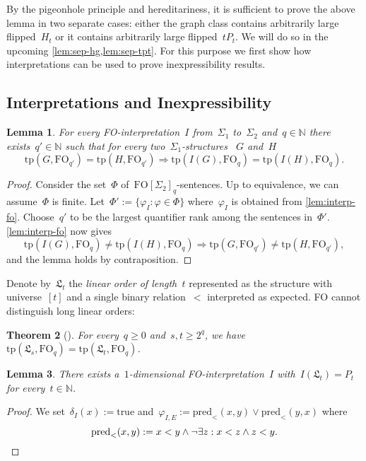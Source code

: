 \documentclass[11pt]{article}      \usepackage[margin=1in]{geometry}  \usepackage{microtype}
\newtheorem{theorem}{Theorem}[section]
\newtheorem{lemma}[theorem]{Lemma}
\theoremstyle{definition}
\newcommand{\N}[0]{\mathrm{\mathbb{N}}}
\newcommand{\tp}{\mathrm{tp}}
\renewcommand{\phi}{\varphi}
\newcommand{\FO}{\mathrm{FO}}
\newcommand{\struc}[1]{\mathfrak{#1}}
\renewcommand{\ge}{\geqslant}
\renewcommand{\geq}{\ge}
\begin{document}
By the pigeonhole principle and hereditariness, it is sufficient to prove
the above lemma in two separate cases:
either the graph class contains arbitrarily large flipped~$H_t$ or it contains arbitrarily large flipped~$tP_t$.
We will do so in the upcoming \cref{lem:sep-hg,lem:sep-tpt}.
For this purpose we first show how interpretations can be used to prove inexpressibility results.





\subsection{Interpretations and Inexpressibility}

\begin{lemma}\label{lem:interp-type}
    For every FO-interpretation~$I$ from~$\Sigma_1$ to~$\Sigma_2$ and~$q \in \N$ there exists~$q' \in \N$ such that for every two~$\Sigma_1$-structures
   ~$G$ and~$H$
    \[
        \tp(G,\FO_{q'}) = \tp(H,\FO_{q'}) \Rightarrow 
        \tp(I(G),\FO_{q}) = \tp(I(H),\FO_{q}). 
    \]
\end{lemma}
\begin{proof}
    Consider the set~$\Phi$ of~$\FO[\Sigma_2]_q$-sentences.
    Up to equivalence, we can assume~$\Phi$ is finite.
    Let~$\Phi' := \{\phi_I : \phi \in \Phi\}$ where~$\phi_I$ is obtained from \cref{lem:interp-fo}.
    Choose~$q'$ to be the largest quantifier rank among the sentences in~$\Phi'$.
    \cref{lem:interp-fo} now gives
    \[
        \tp(I(G),\FO_q) \neq \tp(I(H),\FO_q) \Rightarrow 
        \tp(G,\FO_{q'}) \neq \tp(H,\FO_{q'}),
    \]
    and the lemma holds by contraposition.
\end{proof}

Denote by~$\struc L_t$ the \emph{linear order of length~$t$} represented as the structure with universe~$[t]$ and a single binary relation~$<$ interpreted as expected.
FO cannot distinguish long linear orders:

\begin{theorem}[{\cite[Thm.\ 3.6]{libkin2004elements}}]
    For every~$q \geq 0$ and~$s,t \geq 2^q$, we have~$\tp(\struc L_{s}, \FO_q) = \tp(\struc L_{t}, \FO_q)$.
\end{theorem}

\begin{lemma}\label{lem:interp-order-to-path}
    There exists a~$1$-dimensional FO-interpretation~$I$ with~$I(\struc L_t) = P_t$ for every~$t\in \N$.
\end{lemma}
\begin{proof}
    We set~$\delta_I(x) := \text{true}$ and~$\phi_{I,E} := \mathrm{pred}_<(x,y) \vee \mathrm{pred}_<(y,x)$ where 
    \[
        \mathrm{pred}_<(x,y) := x < y \wedge \neg \exists z: x < z \wedge z < y.\qedhere
    \]
\end{proof}
\end{document}
